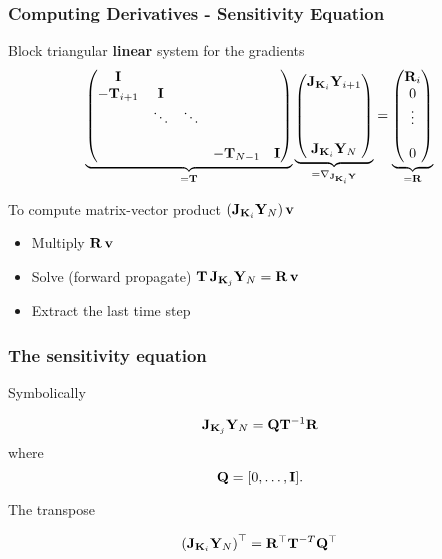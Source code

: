 \documentclass[12pt,fleqn,handout]{beamer}
\begin{document}
\begin{frame}[fragile]\frametitle{Computing Derivatives - Sensitivity Equation}

Block triangular {\bf linear} system for the gradients
{\small
\begin{eqnarray*}
	\underbrace{
\begin{pmatrix}
{\bf I}              &                &                &          &       \\
-{\bf T}_{i+1}    &   {\bf I}       &                &          &       \\
                    & \ddots    &  \ddots    &          &      \\
                    &     &      &          &      \\
                    &     &        &   -{\bf T}_{N-1}       & {\bf I}
                    \end{pmatrix}}_{={\bf T}}
					\underbrace{
                    \begin{pmatrix}
                    {\bf J}_{{\bf K}_i}{\bf Y}_{i+1} \\    \\   \\ \\   {\bf J}_{{\bf K}_i}{\bf Y}_{N}
                    \end{pmatrix}}_{= \nabla_{{\bf J}_{{\bf K}_i} {\bf Y}}} =
					\underbrace{
                    \begin{pmatrix}
                    {\bf R}_i \\  0\\  \vdots \\ \\    0
                    \end{pmatrix}}_{={\bf R}}
\end{eqnarray*}}

To compute matrix-vector product $({\bf J}_{{\bf K}_i}{\bf Y}_{N})\, {\bf v}$
\begin{itemize}
\item Multiply ${\bf R}\, {\bf v}$
\item Solve (forward propagate) ${\bf T}\, {\bf J}_{{\bf K}_j}{\bf Y}_N = {\bf R}\, {\bf v}$
\item Extract the last time step
\end{itemize}

\end{frame}

\begin{frame}[fragile]\frametitle{The sensitivity equation}


Symbolically

$$ {\bf J}_{{\bf K}_j}{\bf Y}_{N}  = {\bf Q} {\bf T}^{-1}  {\bf R}  $$
where
$${\bf Q} = [0,\ldots,{\bf I}]. $$


\bigskip

The transpose

$$ \left({\bf J}_{{\bf K}_i}{\bf Y}_{N}\right)^{\top} =  {\bf R}^{\top} {\bf T}^{-T} {\bf Q}^{\top} $$


\end{frame}
\end{document}

